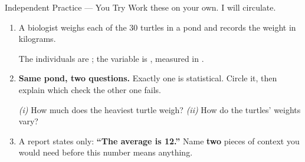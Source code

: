 \documentclass[10pt]{article}
\begin{document}
\boxguard[20]
\begin{notesbox}{Independent Practice --- You Try}
\small
Work these on your own. I will circulate.

\begin{enumerate}[leftmargin=1.9em, itemsep=8pt]
  \item A biologist weighs each of the 30 turtles in a pond and records the weight in kilograms.

        The individuals are ; the variable is ,
        measured in .
  \item \textbf{Same pond, two questions.} Exactly one is statistical. Circle it, then explain
        which check the other one fails.

        \vspace{4pt}
        \hspace{1.0em}\emph{(i)} How much does the heaviest turtle weigh?
        \hfill
        \emph{(ii)} How do the turtles' weights vary? 
        \hspace{1.0em}\\[5pt]
  \item A report states only: \textbf{``The average is 12.''} Name \textbf{two} pieces of
        context you would need before this number means anything.\\[3pt]
\end{enumerate}
\end{notesbox}
\end{document}
